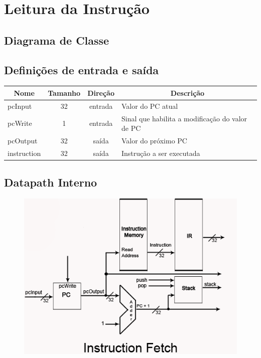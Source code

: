 \section{Leitura da Instrução}
	\subsection{Diagrama de Classe}
  \begin{figure}[H]
    
  \end{figure}
		
		\subsection{Definições de entrada e saída}
		
	\begin{center}
		\begin{longtable}[pos]{| l | c | c | m{7cm} |} \hline
			\multicolumn{1}{|c|}{\cellcolor[gray]{0.9}\textbf{Nome}} & 
			\multicolumn{1}{c|}{\cellcolor[gray]{0.9}\textbf{Tamanho}} & 
			\multicolumn{1}{c|}{\cellcolor[gray]{0.9}\textbf{Direção}} &
			\multicolumn{1}{c|}{\cellcolor[gray]{0.9}\textbf{Descrição}} \\ \hline
			\endhead
			\hline
			\endlastfoot
			pcInput & 32 & entrada & Valor do PC atual\\ \hline
			pcWrite & 1 & entrada & Sinal que habilita a modificação do valor de PC \\ \hline
			pcOutput & 32 & saída & Valor do próximo PC \\ \hline
			instruction & 32 & saída & Instrução a ser executada \\ \hline
			
		\end{longtable}
	\end{center}
	
	\subsection{Datapath Interno}
	\begin{figure}[htpb!]
		\begin{center}
		\includegraphics[scale=0.5]{./datapath/step1.png}
		\end{center}
	\end{figure}
	